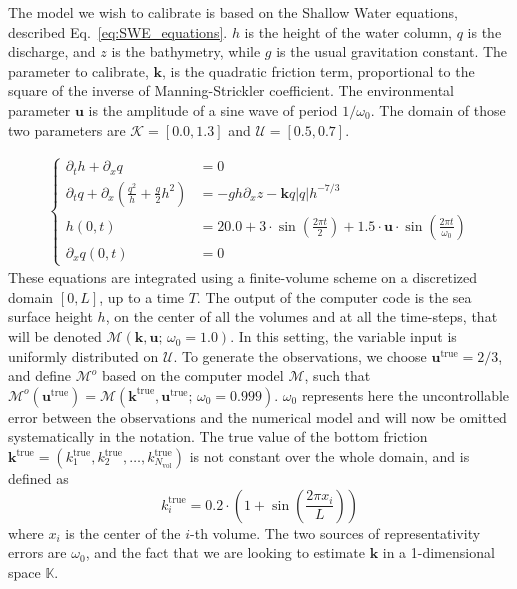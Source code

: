 \documentclass[preprint, 1p]{elsarticle}
\newcommand{\Kspace}{\mathbb{K}}
\begin{document}
The model we wish to calibrate is based on the Shallow Water equations, described Eq.~\eqref{eq:SWE_equations}. $h$ is the height of the water column, $q$ is the discharge, and $z$ is the bathymetry, while $g$ is the usual gravitation constant. The parameter to calibrate, $\mathbf{k}$, is the quadratic friction term, proportional to the square of the inverse of Manning-Strickler coefficient. The environmental parameter $\mathbf{u}$ is the amplitude of a sine wave of period $1/\omega_0$. The domain of those two parameters are $\mathcal{K} = [0.0, 1.3]$ and $\mathcal{U} = [0.5, 0.7]$.


\begin{align}
  \label{eq:SWE_equations}
  \left\{
    \begin{array}{rl}
      \partial_t h + \partial_x q &= 0 \\
      \partial_t q + \partial_x \left(\frac{q^2}{h} + \frac{g}{2}h^2\right) &= - gh\partial_x z - \mathbf{k}q |q|h^{-7/3} \\
      h(0, t) &= 20.0 + 3\cdot \sin \left(\frac{2\pi t}{2}\right) + 1.5\cdot \mathbf{u} \cdot \sin\left(\frac{2 \pi t}{\omega_0}\right)\\
      \partial_x q(0, t) &= 0
      \end{array}
  \right.
\end{align}
These equations are integrated using a finite-volume scheme on a discretized domain $[0, L]$, up to a time $T$. The output of the computer code is the sea surface height $h$, on the center of all the volumes and at all the time-steps, that will be denoted $\mathcal{M}(\mathbf{k},\mathbf{u};\, \omega_0=1.0)$.
In this setting, the variable input is uniformly distributed on $\mathcal{U}$.
To generate the observations, we choose $\mathbf{u}^{\mathrm{true}}=2/3$, and define $\mathcal{M}^o$ based on the computer model $\mathcal{M}$, such that $\mathcal{M}^o(\mathbf{u}^{\mathrm{true}}) = \mathcal{M}(\mathbf{k}^{\mathrm{true}}, \mathbf{u}^{\mathrm{true}}; \, \omega_0 = 0.999)$. $\omega_0$  
represents here the uncontrollable error between the observations and the numerical model and will now be omitted systematically in the notation. The true value of the bottom friction $\mathbf{k}^{\mathrm{true}} = (k_1^{\mathrm{true}}, k_2^{\mathrm{true}},\dots, k_{N_\mathrm{vol}}^{\mathrm{true}})$ is not constant over the whole domain, and is defined as
\begin{equation*}
{k}^{\mathrm{true}}_i = 0.2\cdot \left(1 + \sin\left(\frac{2 \pi x_i}{L}\right)\right)
\end{equation*}
where $x_i$ is the center of the $i$-th volume. The two sources of representativity errors are $\omega_0$, and the fact that we are looking to estimate $\mathbf{k}$ in a 1-dimensional space $\Kspace$. 
\end{document}
